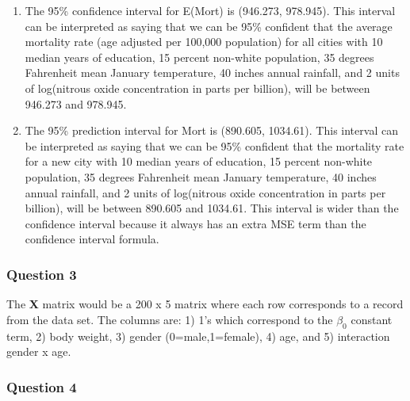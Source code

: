 \documentclass{article}
\begin{document}
\begin{enumerate}
\def\labelenumi{\alph{enumi})}
\setcounter{enumi}{3}
\item
  The 95\% confidence interval for E(Mort) is (946.273, 978.945). This
  interval can be interpreted as saying that we can be 95\% confident
  that the average mortality rate (age adjusted per 100,000 population)
  for all cities with 10 median years of education, 15 percent non-white
  population, 35 degrees Fahrenheit mean January temperature, 40 inches
  annual rainfall, and 2 units of log(nitrous oxide concentration in
  parts per billion), will be between 946.273 and 978.945.
\item
  The 95\% prediction interval for Mort is (890.605, 1034.61). This
  interval can be interpreted as saying that we can be 95\% confident
  that the mortality rate for a new city with 10 median years of
  education, 15 percent non-white population, 35 degrees Fahrenheit mean
  January temperature, 40 inches annual rainfall, and 2 units of
  log(nitrous oxide concentration in parts per billion), will be between
  890.605 and 1034.61. This interval is wider than the confidence
  interval because it always has an extra MSE term than the confidence
  interval formula.
\end{enumerate}

    \subsubsection{Question 3}\label{question-3}

The \textbf{X} matrix would be a 200 x 5 matrix where each row
corresponds to a record from the data set. The columns are: 1) 1's which
correspond to the \(\beta_0\) constant term, 2) body weight, 3) gender
(0=male,1=female), 4) age, and 5) interaction gender x age.

\newpage
    \subsubsection{Question 4}\label{question-4}
\end{document}
